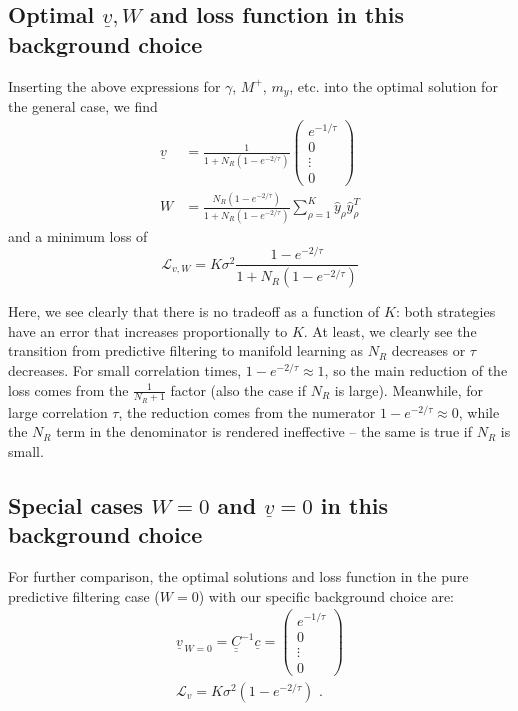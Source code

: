 \documentclass[letter, 12pt]{article}
\def\beq{ \begin{equation} }		%
\def\eeq{ \end{equation} } 			%
\newcommand{\dul}[1]{\underline{\underline{#1}}}
\begin{document}
\subsection{Optimal $\underline{v}, W$ and loss function in this background choice}
Inserting the above expressions for $\gamma$, $M^+$, $m_y$, etc. into the optimal solution for the general case, we find
\begin{align}
	\underline{v} &= \frac{1}{1 + N_R(1 - e^{-2/\tau})} \begin{pmatrix} e^{-1/\tau} \\ 0  \\ \vdots  \\ 0 \end{pmatrix}  \label{eq:v_solution_special}  \\
	W &= \frac{N_R (1 - e^{-2/\tau})}{1 + N_R (1 - e^{-2/\tau})} \sum_{\rho=1}^K \hat{y}_{\rho} \hat{y}_{\rho}^T  \label{eq:w_solution_special}
\end{align}
and a minimum loss of 
\beq
	\mathcal{L}_{v, W} = K \sigma^2 \frac{1 - e^{-2/\tau}}{1 + N_R(1 - e^{-2/\tau})}
	\label{eq:loss_evaluated_special}
\eeq

Here, we see clearly  that there is no tradeoff as a function of $K$: both strategies have an error that increases proportionally to $K$. At least, we clearly see the transition from predictive filtering to manifold learning as $N_R$ decreases or $\tau$ decreases. For small correlation times, $1 - e^{-2/\tau} \approx 1$, so the main reduction of the loss comes from the $\frac{1}{N_R +1}$ factor (also the case if $N_R$ is large). Meanwhile, for large correlation $\tau$, the reduction comes from the numerator $1 - e^{-2/\tau} \approx 0$, while the $N_R$ term in the denominator is rendered ineffective -- the same is true if $N_R$ is small. 


\subsection{Special cases $W=0$ and $\underline{v}=0$ in this background choice}
For further comparison, the optimal solutions and loss function in the pure predictive filtering case ($W=0$) with our specific background choice are:
\begin{align}
	\underline{v}_{\,W=0} = \dul{C}^{-1} \underline{c} = \begin{pmatrix} e^{-1/\tau} \\ 0  \\ \vdots  \\ 0 \end{pmatrix} \nonumber \\
	\mathcal{L}_v = K \sigma^2 (1 - e^{-2/\tau})
	\label{eq:loss_special_v_only} \,\, .
\end{align}
\end{document}

